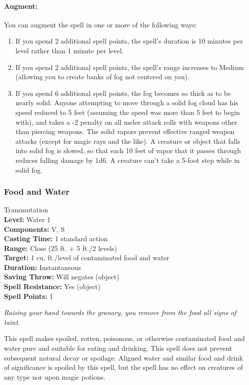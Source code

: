 \paragraph{Augment:} You can augment the spell in one or more of the following ways:
\begin{enumerate}
 \item If you spend 2 additional spell points, the spell's duration is 10 minutes per level rather than 1 minute per level.
 \item If you spend 2 additional spell points, the spell's range increases to Medium (allowing you to create banks of fog not centered on you).
 \item If you spend 6 additional spell points, the fog becomes so thick as to be nearly solid. Anyone attempting to move through a solid fog cloud
has his speed reduced to 5 feet (assuming the speed was more than 5 feet to begin with), and takes a -2 penalty on all melee attack rolls with weapons other
than piercing weapons. The solid vapors prevent effective ranged weapon attacks (except for magic rays and the like). A creature or object that falls into
solid fog is slowed, so that each 10 feet of vapor that it passes through reduces falling damage by 1d6.
A creature can't take a 5-foot step while in solid fog.
\end{enumerate}
\subsubsection{Food and Water}
\label{Spell:FoodAndWater}
Transmutation
\\ \textbf{Level:} Water 1
\\ \textbf{Components:} V, S
\\ \textbf{Casting Time:} 1 standard action
\\ \textbf{Range:} Close (25 ft. + 5 ft./2 levels)
\\ \textbf{Target:} 1 cu. ft./level of contaminated food and water
\\ \textbf{Duration:} Instantaneous
\\ \textbf{Saving Throw:} Will negates (object)
\\ \textbf{Spell Resistance:} Yes (object)
\\ \textbf{Spell Points:} 1

\emph{Raising your hand towards the granary, you remove from the food all signs of taint.}

This spell makes spoiled, rotten, poisonous, or otherwise contaminated food and water pure and suitable for eating and drinking. 
This spell does not prevent subsequent natural decay or spoilage. 
Aligned water and similar food and drink of significance is spoiled by this spell, but the spell has no effect on creatures of any type nor upon magic potions.

